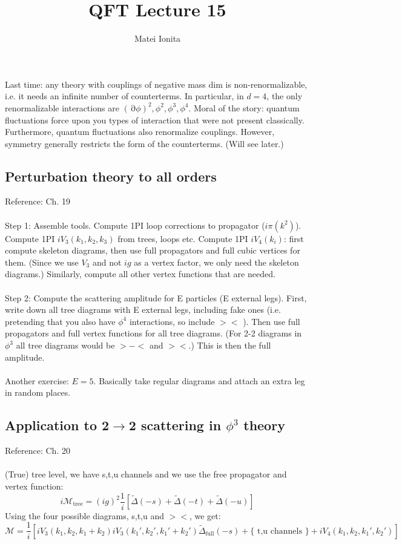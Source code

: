 \documentclass[12 pt]{article}
\title{QFT Lecture 15}
\author{Matei Ionita}
\DeclareMathOperator {\p} {\partial}
\begin{document}
  \maketitle

Last time: any theory with couplings of negative mass dim is non-renormalizable, i.e. it needs an infinite number of counterterms. In particular, in $d=4$, the only renormalizable interactions are $(\p \phi)^2 , \phi^2, \phi^3, \phi^4$. Moral of the story: quantum fluctuations force upon you types of interaction that were not present classically. Furthermore, quantum fluctuations also renormalize couplings. However, symmetry generally restricts the form of the counterterms. (Will see later.)

\subsection*{Perturbation theory to all orders}
Reference: Ch. 19
\\
\\
Step 1: Assemble tools. Compute 1PI loop corrections to propagator ($i \pi(k^2)$). Compute 1PI $iV_3(k_1, k_2, k_3)$ from trees, loops etc. Compute 1PI $iV_4(k_i)$: first compute skeleton diagrams, then use full propagators and full cubic vertices for them. (Since we use $V_3$ and not $ig$ as a vertex factor, we only need the skeleton diagrams.) Similarly, compute all other vertex functions that are needed.
\\
\\
Step 2: Compute the scattering amplitude for E particles (E external legs). First, write down all tree diagrams with E external legs, including fake ones (i.e. pretending that you also have $\phi^4$ interactions, so include $><$ ). Then use full propagators and full vertex functions for all tree diagrams. (For 2-2 diagrams in $\phi^3$ all tree diagrams would be $>-<$ and $><$.) This is then the full amplitude.
\\
\\
Another exercise: $E=5$. Basically take regular diagrams and attach an extra leg in random places.

\subsection*{Application to 2$\to$2 scattering in $\phi^3$ theory}
Reference: Ch. 20
\\
\\
(True) tree level, we have s,t,u channels and we use the free propagator and vertex function:
\[    i\mathcal{M}_{\text{tree}} = (ig)^2 \frac{1}{i} \left[ \tilde \Delta(-s) + \tilde \Delta(-t) + \tilde \Delta (-u)  \right]   \]
Using the four possible diagrams, s,t,u and $><$, we get:
\[      \mathcal{M} =  \frac{1}{i} \left[   iV_3 (k_1, k_2, k_1 + k_2)  i V_3 (k_1', k_2', k_1'+k_2') \tilde \Delta_{\text{full}}(-s)   + \{ \text{ t,u channels } \} + iV_4 (k_1, k_2, k_1', k_2')  \right] \]
\end{document}
